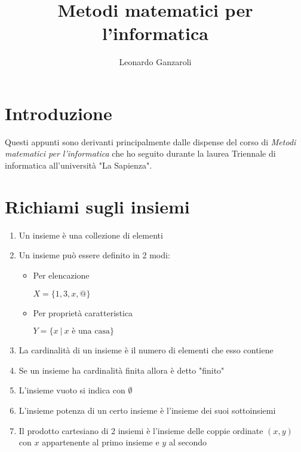 \documentclass{article}
\title{Metodi matematici per l'informatica}
\author{Leonardo Ganzaroli}
\date{}
\begin{document}
\maketitle


\tableofcontents

\newpage

\hypersetup{allcolors=black}

\section*{Introduzione}

Questi appunti sono derivanti principalmente dalle dispense del corso di \textit{Metodi matematici per l'informatica} che ho seguito durante la laurea Triennale di informatica all'università "La Sapienza".

\newpage

\section{Richiami sugli insiemi}

\begin{enumerate}
    \item Un insieme è una collezione di elementi
    \item Un insieme può essere definito in 2 modi:
    \begin{itemize}
    
        \item Per elencazione

            \qquad $X=\{1,3,x,@\}$

        \item Per proprietà caratteristica

            \qquad $Y=\{x\ |\ x \text{ è una casa}\}$
        
    \end{itemize}

    \item La cardinalità di un insieme è il numero di elementi che esso contiene

    \item Se un insieme ha cardinalità finita allora è detto "finito"

    \item L'insieme vuoto si indica con $\emptyset$

    \item L'insieme potenza di un certo insieme è l'insieme dei suoi sottoinsiemi

    \item Il prodotto cartesiano di 2 insiemi è l'insieme delle coppie ordinate $(x,y)$ con $x$ appartenente al primo insieme e $y$ al secondo

\vspace{10pt}
    
\end{enumerate}
\end{document}
